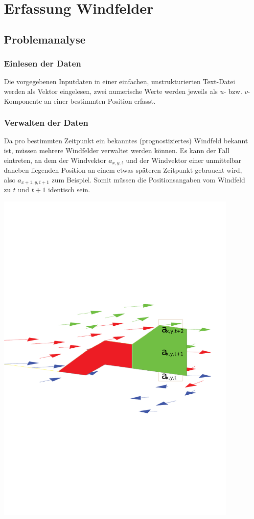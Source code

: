 
\section{Erfassung Windfelder}\label{s:windfields}

\subsection{Problemanalyse}
\subsubsection{Einlesen der Daten}
Die vorgegebenen Inputdaten in einer einfachen, unstrukturierten Text-Datei
werden als Vektor eingelesen, zwei numerische Werte werden jeweils als $u$-
bzw. $v$-Komponente an einer bestimmten Position erfasst.

\subsubsection{Verwalten der Daten}
Da pro bestimmten Zeitpunkt ein bekanntes (prognostiziertes) Windfeld bekannt
ist, müssen mehrere Windfelder verwaltet werden können. Es kann der Fall
eintreten, an dem der Windvektor $a_{x,y,t}$ und der Windvektor einer
unmittelbar daneben liegenden Position an einem etwas späteren Zeitpunkt
gebraucht wird, also $a_{x+1,y,t+1}$ zum Beispiel. Somit müssen die
Positionsangaben vom Windfeld zu $t$ und $t+1$ identisch sein. 

\includegraphics[width=12cm]{img/windfield-different-layer}
